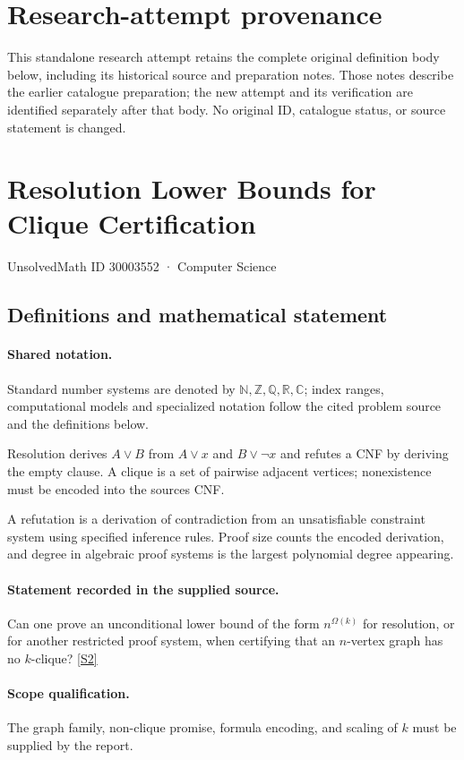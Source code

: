\documentclass[11pt]{article}
\begin{document}
\section*{Research-attempt provenance}
This standalone research attempt retains the complete original definition body below,
including its historical source and preparation notes. Those notes describe the
earlier catalogue preparation; the new attempt and its verification are identified
separately after that body. No original ID, catalogue status, or source statement is changed.

\section{Resolution Lower Bounds for Clique Certification}\label{30003552}
{\small UnsolvedMath ID 30003552 · Computer Science}
\subsection{Definitions and mathematical statement}

\paragraph{Shared notation.}Standard number systems are denoted by $\mathbb N,\mathbb Z,\mathbb Q,\mathbb R,\mathbb C$; index ranges, computational models and specialized notation follow the cited problem source and the definitions below.


Resolution derives $A\lor B$ from $A\lor x$ and $B\lor\neg x$ and refutes a CNF by deriving the empty clause. A clique is a set of pairwise adjacent vertices; nonexistence must be encoded into the source\textquotesingle s CNF.

A refutation is a derivation of contradiction from an unsatisfiable constraint system using specified inference rules. Proof size counts the encoded derivation, and degree in algebraic proof systems is the largest polynomial degree appearing.
\paragraph{Statement recorded in the supplied source.}
Can one prove an unconditional lower bound of the form $n^{\Omega(k)}$ for resolution, or for another restricted proof system, when certifying that an $n$-vertex graph has no $k$-clique? \href{https://doi.org/10.4171/owr/2017/37}{[S2]}
\paragraph{Scope qualification.}
The graph family, non-clique promise, formula encoding, and scaling of $k$ must be supplied by the report.
\end{document}
